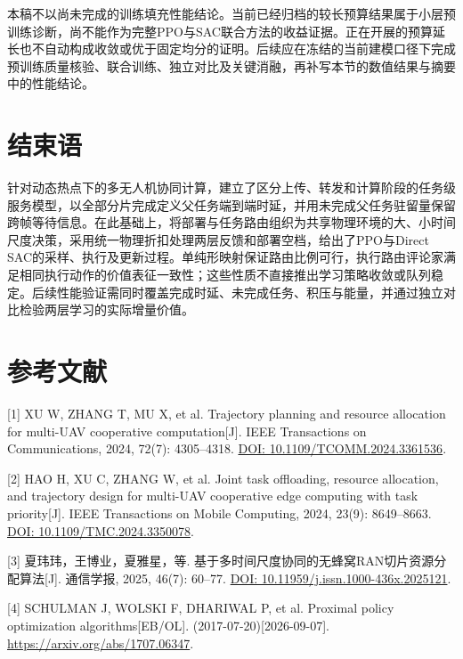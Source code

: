 本稿不以尚未完成的训练填充性能结论。当前已经归档的较长预算结果属于小层预训练诊断，尚不能作为完整PPO与SAC联合方法的收益证据。正在开展的预算延长也不自动构成收敛或优于固定均分的证明。后续应在冻结的当前建模口径下完成预训练质量核验、联合训练、独立对比及关键消融，再补写本节的数值结果与摘要中的性能结论。


\section{结束语}
针对动态热点下的多无人机协同计算，建立了区分上传、转发和计算阶段的任务级服务模型，以全部分片完成定义父任务端到端时延，并用未完成父任务驻留量保留跨帧等待信息。在此基础上，将部署与任务路由组织为共享物理环境的大、小时间尺度决策，采用统一物理折扣处理两层反馈和部署空档，给出了PPO与Direct SAC的采样、执行及更新过程。单纯形映射保证路由比例可行，执行路由评论家满足相同执行动作的价值表征一致性；这些性质不直接推出学习策略收敛或队列稳定。后续性能验证需同时覆盖完成时延、未完成任务、积压与能量，并通过独立对比检验两层学习的实际增量价值。


\section*{参考文献}
\small
\setlength{\itemsep}{2pt}
\par \textnormal{[1]} 
XU W, ZHANG T, MU X, et al.
Trajectory planning and resource allocation for multi-UAV cooperative computation[J].
IEEE Transactions on Communications, 2024, 72(7): 4305--4318.
\href{https://doi.org/10.1109/TCOMM.2024.3361536}{DOI: 10.1109/TCOMM.2024.3361536}.

\par \textnormal{[2]} 
HAO H, XU C, ZHANG W, et al.
Joint task offloading, resource allocation, and trajectory design for multi-UAV cooperative edge computing with task priority[J].
IEEE Transactions on Mobile Computing, 2024, 23(9): 8649--8663.
\href{https://doi.org/10.1109/TMC.2024.3350078}{DOI: 10.1109/TMC.2024.3350078}.

\par \textnormal{[3]} 
夏玮玮，王博业，夏雅星，等.
基于多时间尺度协同的无蜂窝RAN切片资源分配算法[J].
通信学报, 2025, 46(7): 60--77.
\href{https://doi.org/10.11959/j.issn.1000-436x.2025121}{DOI: 10.11959/j.issn.1000-436x.2025121}.

\par \textnormal{[4]} 
SCHULMAN J, WOLSKI F, DHARIWAL P, et al.
Proximal policy optimization algorithms[EB/OL].
(2017-07-20)[2026-09-07].
\url{https://arxiv.org/abs/1707.06347}.

